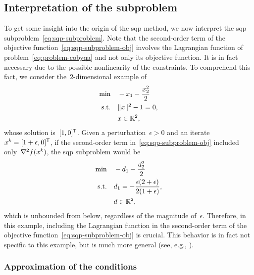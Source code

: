 \subsection{Interpretation of the subproblem}

To get some insight into the origin of the \gls{sqp} method, we now interpret the \gls{sqp} subproblem~\cref{eq:sqp-subproblem}.
Note that the second-order term of the objective function~\cref{eq:sqp-subproblem-obj} involves the Lagrangian function of problem~\cref{eq:problem-cobyqa} and not only its objective function.
It is in fact necessary due to the possible nonlinearity of the constraints.
To comprehend this fact, we consider the~$2$-dimensional example of \citeauthor{Boggs_Tolle_1995}~\cite{Boggs_Tolle_1995}
\begin{align*}
    \min        & \quad -x_1 - \frac{x_2^2}{2}\\
    \text{s.t.} & \quad \lVert x\rVert^2 - 1 = 0,\\
                & \quad x \in \mathbb{R}^2,
\end{align*}
whose solution is~$[1, 0]^{\mathsf{T}}$.
Given a perturbation~$\epsilon > 0$ and an iterate~$x^k = [1 + \epsilon, 0]^{\mathsf{T}}$, if the second-order term in~\cref{eq:sqp-subproblem-obj} included only~$\nabla^2 f(x^k)$, the \gls{sqp} subproblem would be
\begin{align*}
    \min        & \quad -d_1 - \frac{d_2^2}{2}\\
    \text{s.t.} & \quad d_1 = -\frac{\epsilon (2 + \epsilon)}{2 (1 + \epsilon)},\\
                & \quad d \in \mathbb{R}^2,
\end{align*}
which is unbounded from below, regardless of the magnitude of~$\epsilon$.
Therefore, in this example, including the Lagrangian function in the second-order term of the objective function~\cref{eq:sqp-subproblem-obj} is crucial.
This behavior is in fact not specific to this example, but is much more general (see, e.g., \cite[ch.~18]{Nocedal_Wright_2006}).

\subsubsection{Approximation of the  conditions}

